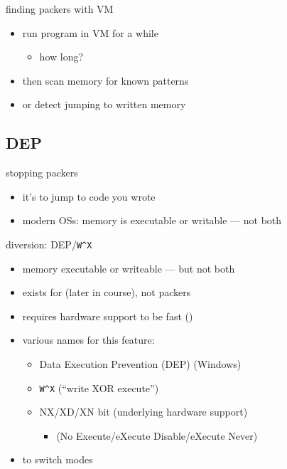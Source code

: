 \begin{frame}{finding packers with VM}
    \begin{itemize}
    \item run program in VM for a while
        \begin{itemize}
        \item how long?
        \end{itemize}
    \item then scan memory for known patterns
    \item or detect jumping to written memory
    \end{itemize}
\end{frame}

\subsection{DEP}

\begin{frame}{stopping packers}
    \begin{itemize}
    \item it's  to jump to code you wrote
    \item modern OSs: memory is executable or writable --- not both
    \end{itemize}
\end{frame}

\begin{frame}{diversion: DEP/{\tt W\textasciicircum X}}
    \begin{itemize}
    \item memory executable or writeable --- but not both
    \item exists for  (later in course), not packers
    \item requires hardware support to be fast ()
    \item various names for this feature:
        \begin{itemize}
        \item Data Execution Prevention (DEP) (Windows)
        \item {\tt W\textasciicircum X} (``write XOR execute'')
        \item NX/XD/XN bit  (underlying hardware support)
            \begin{itemize}
            \item (No Execute/eXecute Disable/eXecute Never)
            \end{itemize}
        \end{itemize}
    \item {} to switch modes
    \end{itemize}
\end{frame}

